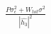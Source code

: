 \documentclass[preview]{standalone}
\begin{document}
\begin{align*}
\frac{P \sigma_\epsilon^2 + W_{tot} \sigma^2}{\left|\hat{h_3}\right|^2}
\end{align*}
\end{document}
